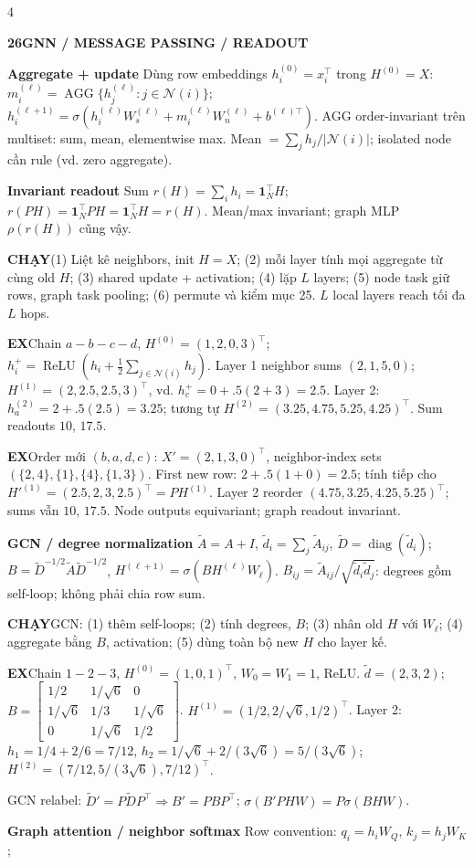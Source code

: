 \documentclass[a4paper]{article}
\newcommand{\topic}[2]{\par\addvspace{.8pt}%
  \begingroup\setlength{\fboxsep}{0.5pt}%
  \noindent\colorbox{structure}{\parbox{\dimexpr\linewidth-2\fboxsep\relax}{%
    \color{white}\fontsize{6.5}{7.1}\selectfont\bfseries #1\enspace #2}}%
  \endgroup\par\nobreak\vspace{.3pt}\nobreak}
\newcommand{\run}[1]{\key{CHẠY}#1}
\newcommand{\key}[1]{\par\textcolor{structure}{\textbf{#1}}\enspace}
\newcommand{\note}[4]{\par\begingroup\setlength{\fboxsep}{0.15pt}%
  \noindent\colorbox{#1}{\parbox{\dimexpr\linewidth-2\fboxsep\relax}{%
    \RaggedRight\textcolor{#2}{\textbf{#3}}\enspace #4}}%
  \endgroup\par}
\newcommand{\ex}[1]{\note{examplebg}{example}{EX}{#1}}
\newcommand{\ind}{\mathbf1}
\newcommand{\diag}{\operatorname{diag}}
\begin{document}
\begin{multicols*}{4}
\topic{26}{GNN / MESSAGE PASSING / READOUT}
\key{Aggregate + update}
Dùng row embeddings $h_i^{(0)}=x_i^\top$ trong $H^{(0)}=X$:
$m_i^{(\ell)}=\operatorname{AGG}\{h_j^{(\ell)}:j\in\mathcal N(i)\}$;
$h_i^{(\ell+1)}=\sigma(h_i^{(\ell)}W_s^{(\ell)}+m_i^{(\ell)}W_n^{(\ell)}+b^{(\ell)\top})$.
AGG order-invariant trên multiset: sum, mean, elementwise max. Mean $=\sum_jh_j/|\mathcal N(i)|$; isolated node cần rule (vd. zero aggregate).
\key{Invariant readout}
Sum $r(H)=\sum_i h_i=\ind_N^\top H$;
$r(PH)=\ind_N^\top PH=\ind_N^\top H=r(H)$.
Mean/max invariant; graph MLP $\rho(r(H))$ cũng vậy.
\run{(1) Liệt kê neighbors, init $H=X$; (2) mỗi layer tính mọi aggregate từ cùng old $H$; (3) shared update + activation; (4) lặp $L$ layers; (5) node task giữ rows, graph task pooling; (6) permute và kiểm mục 25. $L$ local layers reach tối đa $L$ hops.}
\ex{Chain $a-b-c-d$, $H^{(0)}=(1,2,0,3)^\top$; $h_i^+=\operatorname{ReLU}(h_i+\tfrac12\sum_{j\in\mathcal N(i)}h_j)$. Layer 1 neighbor sums $(2,1,5,0)$; $H^{(1)}=(2,2.5,2.5,3)^\top$, vd. $h_c^+=0+.5(2+3)=2.5$. Layer 2: $h_a^{(2)}=2+.5(2.5)=3.25$; tương tự $H^{(2)}=(3.25,4.75,5.25,4.25)^\top$. Sum readouts $10$, $17.5$.}
\ex{Order mới $(b,a,d,c)$: $X'=(2,1,3,0)^\top$, neighbor-index sets $(\{2,4\},\{1\},\{4\},\{1,3\})$. First new row: $2+.5(1+0)=2.5$; tính tiếp cho $H'^{(1)}=(2.5,2,3,2.5)^\top=PH^{(1)}$. Layer 2 reorder $(4.75,3.25,4.25,5.25)^\top$; sums vẫn $10$, $17.5$. Node outputs equivariant; graph readout invariant.}
\key{GCN / degree normalization}
$\tilde A=A+I$, $\tilde d_i=\sum_j\tilde A_{ij}$, $\tilde D=\diag(\tilde d_i)$;
$B=\tilde D^{-1/2}\tilde A\tilde D^{-1/2}$,
$H^{(\ell+1)}=\sigma(BH^{(\ell)}W_\ell)$.
$B_{ij}=\tilde A_{ij}/\sqrt{\tilde d_i\tilde d_j}$: degrees gồm self-loop; không phải chia row sum.
\run{GCN: (1) thêm self-loops; (2) tính degrees, $B$; (3) nhân old $H$ với $W_\ell$; (4) aggregate bằng $B$, activation; (5) dùng toàn bộ new $H$ cho layer kế.}
\ex{Chain $1-2-3$, $H^{(0)}=(1,0,1)^\top$, $W_0=W_1=1$, ReLU. $\tilde d=(2,3,2)$; $B=\left[\begin{smallmatrix}1/2&1/\sqrt6&0\\1/\sqrt6&1/3&1/\sqrt6\\0&1/\sqrt6&1/2\end{smallmatrix}\right]$. $H^{(1)}=(1/2,2/\sqrt6,1/2)^\top$. Layer 2: $h_1=1/4+2/6=7/12$, $h_2=1/\sqrt6+2/(3\sqrt6)=5/(3\sqrt6)$; $H^{(2)}=(7/12,5/(3\sqrt6),7/12)^\top$.}
GCN relabel: $\tilde D'=P\tilde DP^\top\Rightarrow B'=PBP^\top$; $\sigma(B'PHW)=P\sigma(BHW)$.
\key{Graph attention / neighbor softmax}
Row convention: $q_i=h_iW_Q$, $k_j=h_jW_K$;

\end{multicols*}
\end{document}
